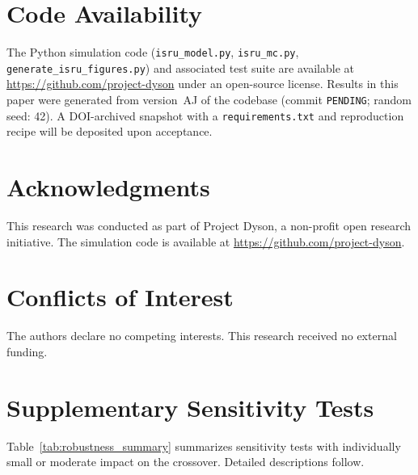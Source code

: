 \documentclass[preprint,12pt]{elsarticle}
\begin{document}
\section*{Code Availability}

The Python simulation code (\texttt{isru\_model.py}, \texttt{isru\_mc.py}, \texttt{generate\_isru\_figures.py}) and associated test suite are available at \url{https://github.com/project-dyson} under an open-source license. Results in this paper were generated from version~AJ of the codebase (commit \texttt{PENDING}; random seed: 42). A DOI-archived snapshot with a \texttt{requirements.txt} and reproduction recipe will be deposited upon acceptance.


\section*{Acknowledgments}

This research was conducted as part of Project Dyson, a non-profit open research initiative. The simulation code is available at \url{https://github.com/project-dyson}.

\section*{Conflicts of Interest}

The authors declare no competing interests. This research received no external funding.

\appendix
\section{Supplementary Sensitivity Tests}
\label{sec:appendix_sensitivity}

Table~\ref{tab:robustness_summary} summarizes sensitivity tests with individually small or moderate impact on the crossover. Detailed descriptions follow.
\end{document}
